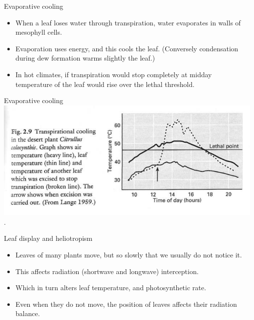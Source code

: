 \documentclass[10pt]{beamer}
\begin{document}
\begin{frame}{Evaporative cooling}
    \begin{itemize}
        \item When a leaf loses water through transpiration,
        water evaporates in walls of mesophyll cells.
        \item Evaporation uses energy, and this cools the leaf.
        (Conversely condensation during dew formation warms slightly
        the leaf.)
        \item In hot climates, if transpiration would stop completely
        at midday temperature of the leaf would rise over the lethal
        threshold.
    \end{itemize}
\end{frame}

\begin{frame}{Evaporative cooling}
    \centering\includegraphics[width=\textwidth]{figures/Crawley2.9LeafLethalTemperature}\\
    {\small \autocite[from][]{Crawley1997}.}
\end{frame}

\begin{frame}{Leaf display and heliotropism}
    \begin{itemize}
        \item Leaves of many plants move, but so slowly that we
        usually do not notice it.
        \item This affects radiation (shortwave and
        longwave) interception.
        \item Which in turn alters leaf temperature, and
        photosynthetic rate.
        \item Even when they do not move, the position of leaves
        affects their radiation balance.
    \end{itemize}
\end{frame}
\end{document}

